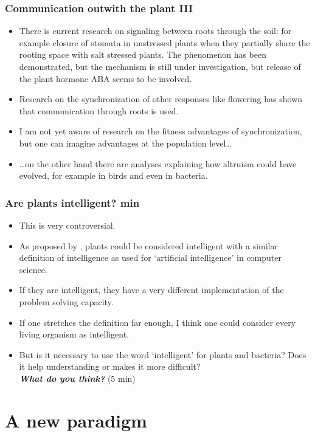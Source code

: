 \documentclass[10pt]{beamer}
\begin{document}
\begin{frame}
\frametitle{Communication outwith the plant III}
  \begin{itemize}
    \item There is current research on signaling between roots through the soil: for example closure of stomata in unstressed plants when they partially share the rooting space with salt stressed plants. The phenomenon has been demonstrated, but the mechanism is still under investigation, but release of the plant hormone ABA seems to be involved.
    \item Research on the synchronization of other responses like flowering has shown that communication through roots is used.
    \item I am not yet aware of research on the fitness advantages of synchronization, but one can imagine advantages at the population level\ldots
    \item \ldots on the other hand there are analyses explaining how altruism could have evolved, for example in birds and even in bacteria.
\end{itemize}
\end{frame}

\begin{frame}
\frametitle{Are plants intelligent?  min}
    \begin{itemize}
        \item This is very controversial.
        \item As proposed by  \autocite{Trewavas2014}, plants could be considered intelligent with a similar definition of intelligence as used for `artificial intelligence' in computer science.
        \item If they are intelligent, they have a very different implementation of the problem solving capacity.
        \item If one stretches the definition far enough, I think one could consider every living organism as intelligent.
        \item But is it necessary to use the word `intelligent' for plants and bacteria? Does it help understanding or makes it more difficult?\\[1ex]
        \emph{\textbf{What do you think?}} (5 min)
    \end{itemize}
\end{frame}

\section{A new paradigm}
\end{document}

